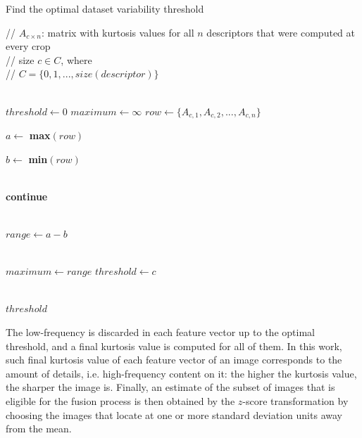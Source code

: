 \begin{algorithm}[ht]
	\caption{Find the optimal dataset variability threshold}
	\label{alg:cut_threshold}
	\begin{algorithmic}[1]
 		\State // $A_{c \times n}$: matrix with kurtosis values for all $n$ descriptors that were computed at every crop \\ // size $c \in C$, where \\ // $C = \{0,1,...,size(descriptor)\}$ 
		
		\\
		
		\State $threshold \gets 0$
		\State $maximum \gets \infty$
		\State $row \gets \{A_{c,1},A_{c,2},...,A_{c,n}\}$ 
		
		\State $a \gets$ \textbf{max}$(row)$
		
		\State $b \gets$ \textbf{min}$(row)$
		
		\\
		
		    \State \textbf{continue}
		\EndIf
		
		\\
		
		\State $range \gets a - b$
		
		\\
		
		    \State $maximum \gets range$
		    \State $threshold \gets c$
		\EndIf
		
		\EndFor
		\\
		\Return $threshold$
	\end{algorithmic}
\end{algorithm}

The low-frequency is discarded in each feature vector up to the optimal threshold, and a final kurtosis value is computed for all of them. In this work, such final kurtosis value of each feature vector of an image corresponds to the amount of details, i.e. high-frequency content on it: the higher the kurtosis value, the sharper the image is. Finally, an estimate of the subset of images that is eligible for the fusion process is then obtained by the $z$-score transformation by choosing the images that locate at one or more standard deviation units away from the mean.

